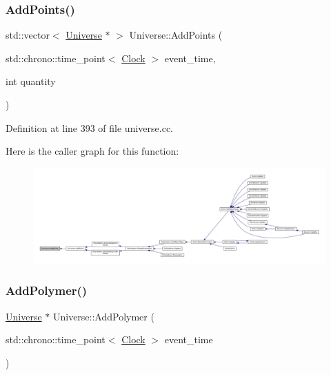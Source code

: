 \subsubsection{\texorpdfstring{Add\+Points()}{AddPoints()}}
{\footnotesize\ttfamily std\+::vector$<$ \mbox{\hyperlink{class_universe}{Universe}} $\ast$ $>$ Universe\+::\+Add\+Points (\begin{DoxyParamCaption}\item[{std\+::chrono\+::time\+\_\+point$<$ \mbox{\hyperlink{universe_8h_a0ef8d951d1ca5ab3cfaf7ab4c7a6fd80}{Clock}} $>$}]{event\+\_\+time,  }\item[{int}]{quantity }\end{DoxyParamCaption})}



Definition at line 393 of file universe.\+cc.

Here is the caller graph for this function\+:\nopagebreak
\begin{figure}[H]
\begin{center}
\leavevmode
\includegraphics[width=350pt]{class_universe_aa48ced2078ba863723050d8283b3fa67_icgraph}
\end{center}
\end{figure}
\mbox{\label{class_universe_a4ea0af5d2eb7b5070a83f7da29526fbd}} 
\subsubsection{\texorpdfstring{Add\+Polymer()}{AddPolymer()}}
{\footnotesize\ttfamily \mbox{\hyperlink{class_universe}{Universe}} $\ast$ Universe\+::\+Add\+Polymer (\begin{DoxyParamCaption}\item[{std\+::chrono\+::time\+\_\+point$<$ \mbox{\hyperlink{universe_8h_a0ef8d951d1ca5ab3cfaf7ab4c7a6fd80}{Clock}} $>$}]{event\+\_\+time }\end{DoxyParamCaption})}



